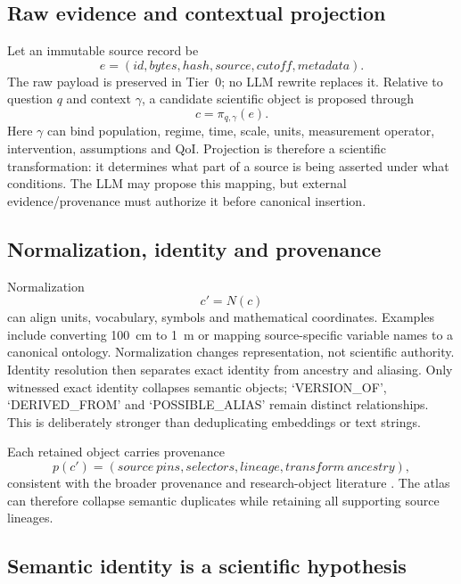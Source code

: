 \subsection{Raw evidence and contextual projection}
Let an immutable source record be
\begin{equation}
e=(id,bytes,hash,source,cutoff,metadata).
\end{equation}
The raw payload is preserved in Tier~0; no LLM rewrite replaces it. Relative to question $q$ and context $\gamma$, a candidate scientific object is proposed through
\begin{equation}c=\pi_{q,\gamma}(e).
\end{equation}
Here $\gamma$ can bind population, regime, time, scale, units, measurement operator, intervention, assumptions and QoI. Projection is therefore a scientific transformation: it determines what part of a source is being asserted under what conditions. The LLM may propose this mapping, but external evidence/provenance must authorize it before canonical insertion.

\subsection{Normalization, identity and provenance}
Normalization
\begin{equation}c'=N(c)
\end{equation}
can align units, vocabulary, symbols and mathematical coordinates. Examples include converting 100~cm to 1~m or mapping source-specific variable names to a canonical ontology. Normalization changes representation, not scientific authority. Identity resolution then separates exact identity from ancestry and aliasing. Only witnessed exact identity collapses semantic objects; `VERSION\_OF', `DERIVED\_FROM' and `POSSIBLE\_ALIAS' remain distinct relationships. This is deliberately stronger than deduplicating embeddings or text strings.

Each retained object carries provenance
\begin{equation}p(c')=(source\ pins,selectors,lineage,transform\ ancestry),
\end{equation}
consistent with the broader provenance and research-object literature \cite{moreau2013,wilkinson2016,soilandreyes2022,kuhn2018}. The atlas can therefore collapse semantic duplicates while retaining all supporting source lineages.

\subsection{Semantic identity is a scientific hypothesis}

